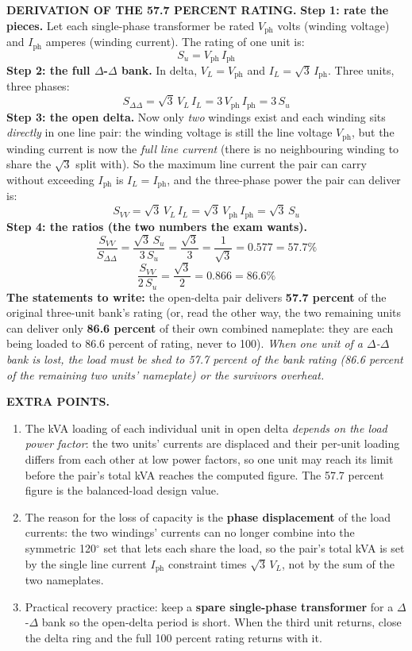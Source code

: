 \documentclass[11pt]{article}
\newcommand{\tagline}[1]{\textbf{\color{copper}#1}}
\begin{document}
\tagline{DERIVATION OF THE 57.7 PERCENT RATING.}
\textbf{Step 1: rate the pieces.} Let each single-phase transformer be rated $V_{\text{ph}}$ volts (winding voltage) and $I_{\text{ph}}$ amperes (winding current). The rating of one unit is:
\[
S_u = V_{\text{ph}}\, I_{\text{ph}}
\]
\textbf{Step 2: the full $\Delta$-$\Delta$ bank.} In delta, $V_L = V_{\text{ph}}$ and $I_L = \sqrt{3}\, I_{\text{ph}}$. Three units, three phases:
\[
S_{\Delta\Delta} = \sqrt{3}\, V_L\, I_L = 3\, V_{\text{ph}}\, I_{\text{ph}} = 3\, S_u
\]
\textbf{Step 3: the open delta.} Now only \emph{two} windings exist and each winding sits \emph{directly} in one line pair: the winding voltage is still the line voltage $V_{\text{ph}}$, but the winding current is now the \emph{full line current} (there is no neighbouring winding to share the $\sqrt{3}$ split with). So the maximum line current the pair can carry without exceeding $I_{\text{ph}}$ is $I_L = I_{\text{ph}}$, and the three-phase power the pair can deliver is:
\[
S_{VV} = \sqrt{3}\, V_L\, I_L = \sqrt{3}\, V_{\text{ph}}\, I_{\text{ph}} = \sqrt{3}\, S_u
\]
\textbf{Step 4: the ratios (the two numbers the exam wants).}
\[
\frac{S_{VV}}{S_{\Delta\Delta}} = \frac{\sqrt{3}\, S_u}{3\, S_u} = \frac{\sqrt{3}}{3} = \frac{1}{\sqrt{3}} = 0.577 = 57.7\%
\]
\[
\frac{S_{VV}}{2\, S_u} = \frac{\sqrt{3}}{2} = 0.866 = 86.6\%
\]
\textbf{The statements to write:} the open-delta pair delivers \textbf{57.7 percent} of the original three-unit bank's rating (or, read the other way, the two remaining units can deliver only \textbf{86.6 percent} of their own combined nameplate: they are each being loaded to 86.6 percent of rating, never to 100). \emph{When one unit of a $\Delta$-$\Delta$ bank is lost, the load must be shed to 57.7 percent of the bank rating (86.6 percent of the remaining two units' nameplate) or the survivors overheat.}

\tagline{EXTRA POINTS.}
\begin{enumerate}[label=\arabic*.]
\item The kVA loading of each individual unit in open delta \emph{depends on the load power factor}: the two units' currents are displaced and their per-unit loading differs from each other at low power factors, so one unit may reach its limit before the pair's total kVA reaches the computed figure. The 57.7 percent figure is the balanced-load design value.
\item The reason for the loss of capacity is the \textbf{phase displacement} of the load currents: the two windings' currents can no longer combine into the symmetric 120$^\circ$ set that lets each share the load, so the pair's total kVA is set by the single line current $I_{\text{ph}}$ constraint times $\sqrt{3}\,V_L$, not by the sum of the two nameplates.
\item Practical recovery practice: keep a \textbf{spare single-phase transformer} for a $\Delta$-$\Delta$ bank so the open-delta period is short. When the third unit returns, close the delta ring and the full 100 percent rating returns with it.
\end{enumerate}
\end{document}
